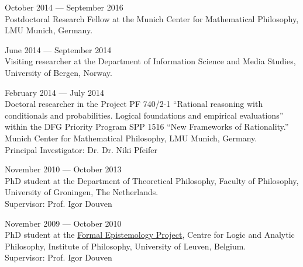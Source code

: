 \documentclass[11pt,article,oneside]{memoir}
\begin{document}
\ind October 2014 --- September 2016\\
Postdoctoral Research Fellow at the Munich Center for Mathematical Philosophy, LMU Munich, Germany.

\ind June 2014 --- September 2014\\ 
    Visiting researcher at the Department of Information Science and Media Studies, University of Bergen, Norway. 

\ind February 2014 --- July 2014\\
	Doctoral researcher in the Project PF 740/2-1 ``Rational reasoning with conditionals and probabilities. Logical foundations and empirical evaluations'' within the DFG Priority Program SPP 1516 ``New Frameworks of Rationality.'' Munich Center for Mathematical Philosophy, LMU Munich, Germany. \\
  Principal Investigator: Dr. Dr. Niki Pfeifer
    
\ind November 2010 --- October 2013\\
	PhD student at the Department of Theoretical Philosophy, Faculty of Philosophy, University of Groningen, The Netherlands. \\
     Supervisor: Prof. Igor Douven

\ind November 2009 --- October 2010\\ 
    PhD student at the  \href{http://formalphilosophy.org/}{Formal Epistemology Project}, Centre for Logic and Analytic Philosophy, Institute of Philosophy, University of Leuven, Belgium.\\ 
     Supervisor: Prof. Igor Douven
\end{document}
